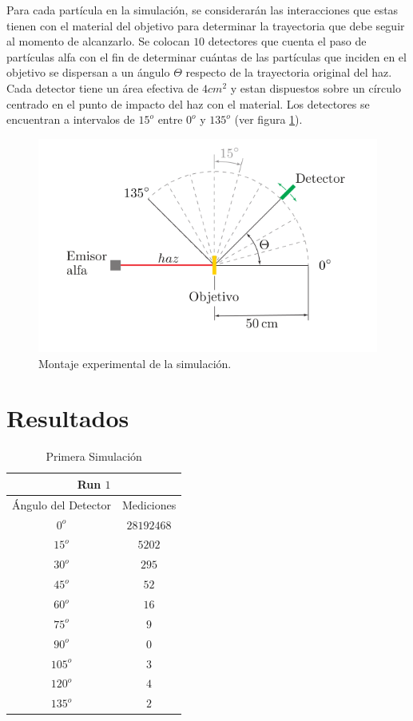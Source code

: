 \documentclass[conference]{IEEEtran}
\begin{document}
Para cada partícula en la simulación, se considerarán las interacciones que estas tienen con el material del objetivo para determinar la trayectoria que debe seguir al momento de alcanzarlo. Se colocan $10$ detectores que cuenta el paso de partículas alfa con el fin de determinar cuántas de las partículas que inciden en el objetivo se dispersan a un ángulo $\Theta$ respecto de la trayectoria original del haz. Cada detector tiene un área efectiva de $4 cm^2$ y estan dispuestos sobre un círculo centrado en el punto de impacto del haz con el material. Los detectores se encuentran a intervalos de $15^o$ entre $0^o$ y $135^o$ (ver figura \ref{montaje}).
        
\begin{figure}
	\centering
	\includegraphics[scale=0.3]{Imagenes/montaje.png}
	\caption{Montaje experimental de la simulación.}     
	\label{montaje}   
\end{figure}
        
        
\section{Resultados}

\begin{table}[H]
	\centering
	\caption{Primera Simulación}
	\begin{tabular}{||c|c||}
	\hline
	\hline
	\multicolumn{2}{||c||}{Run $1$} \\
	\hline
	\hline
	Ángulo del Detector & Mediciones \\
	\hline
	$0^o$   & $28192468$ \\
	$15^o$  & $5202$     \\
	$30^o$  & $295$      \\ 
	$45^o$  & $52$       \\
	$60^o$  & $16$       \\
	$75^o$  & $9$        \\
	$90^o$  & $0$        \\
	$105^o$ & $3$        \\
	$120^o$ & $4$        \\
	$135^o$ & $2$        \\
	\hline
	\hline
	\end{tabular}
\end{table}
\end{document}
